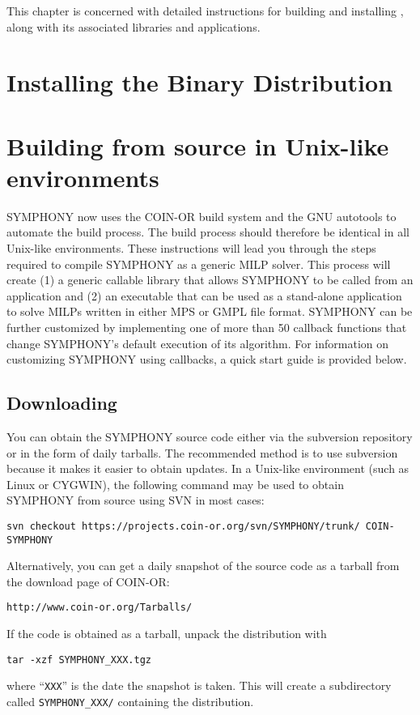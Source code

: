 This chapter is concerned with detailed instructions for building and
installing \BB, along with its associated libraries and applications.

\section{Installing the Binary Distribution}


\section{Building from source in Unix-like environments}
\label{getting_started_unix}

SYMPHONY now uses the COIN-OR build system and the GNU autotools to automate
the build process. The build process should therefore be identical in all
Unix-like environments. These instructions will lead you through the steps
required to compile SYMPHONY as a generic MILP solver. This process will
create (1) a generic callable library that allows SYMPHONY to be called from
an application and (2) an executable that can be used as a stand-alone
application to solve MILPs written in either MPS or GMPL file format. SYMPHONY
can be further customized by implementing one of more than 50 callback
functions that change SYMPHONY's default execution of its algorithm. For
information on customizing SYMPHONY using callbacks, a quick start guide is
provided below.

\subsection{Downloading}

You can obtain the SYMPHONY source code either via the subversion repository
or in the form of daily tarballs. The recommended method is to use subversion
because it makes it easier to obtain updates. In a Unix-like environment (such
as Linux or CYGWIN), the following command may be used to obtain SYMPHONY from
source using SVN in most cases:
\begin{verbatim}
svn checkout https://projects.coin-or.org/svn/SYMPHONY/trunk/ COIN-SYMPHONY
\end{verbatim}
Alternatively, you can get a daily snapshot of the source code as a tarball
from the download page of COIN-OR:
\begin{verbatim}
http://www.coin-or.org/Tarballs/
\end{verbatim}
If the code is obtained as a tarball, unpack the distribution with 
\begin{verbatim}
tar -xzf SYMPHONY_XXX.tgz
\end{verbatim}
where ``\texttt{XXX}'' is the date the snapshot is taken. This will create a
subdirectory called \texttt{SYMPHONY\_XXX/} containing the distribution.

